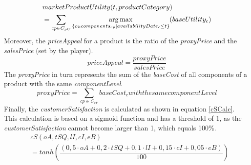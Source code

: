 \begin{equation}
\label{marketProdUtility}
\begin{aligned}
    & marketProductUtility(t, productCategory) \\
    & = \sum_{cp \in C_{pC}} \operatorname*{arg\,max}\limits_{\{c \in components_{cp}| availabilityDate_c \leq t\}}(baseUtility_c)
\end{aligned}    
\end{equation}
Moreover, the \textit{priceAppeal} for a product is the ratio of the \textit{proxyPrice} and the \textit{salesPrice} (set by the player).
\begin{equation}
    priceAppeal = \dfrac{proxyPrice}{salesPrice}
\end{equation}
The \textit{proxyPrice} in turn represents the sum of the \textit{baseCost} of all components of a product with the same \textit{componentLevel}.
\begin{equation}
    proxyPrice = \sum_{cp \in C_{cP}} baseCost_{c} with the same componentLevel
\end{equation}
Finally, the \textit{customerSatisfaction} is calculated as shown in equation \ref{cSCalc}. This calculation is based on a sigmoid function and has a threshold of $1$, as the \textit{customerSatisfaction} cannot become larger than 1, which equals 100\%.
\begin{equation}
\begin{aligned}
\label{cSCalc}
    & cS(oA, tSQ, lI, cI, eB) \\
    & = tanh(\dfrac{(0,5 \cdot oA + 0,2 \cdot tSQ + 0,1 \cdot lI + 0,15 \cdot cI + 0,05 \cdot eB)}{100}) %
\end{aligned}    
\end{equation}

